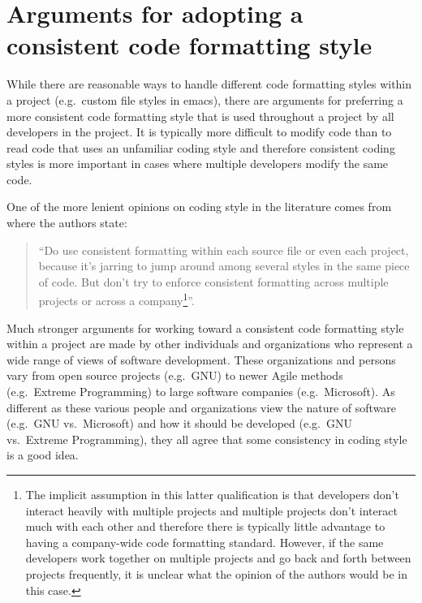 %
\section{Arguments for adopting a consistent code formatting style}
\label{sec:arguments-for-consistent-style}
%

While there are reasonable ways to handle different code formatting styles
within a project (e.g.\ custom file styles in emacs), there are arguments for
preferring a more consistent code formatting style that is used throughout a
project by all developers in the project.  It is typically more difficult to
modify code than to read code that uses an unfamiliar coding style and
therefore consistent coding styles is more important in cases where multiple
developers modify the same code.

One of the more lenient opinions on coding style in the literature comes from
{}\cite[Item 0]{C++CodingStandards05} where the authors state:

\begin{quote}

``Do use consistent formatting within each source file or even each project,
because it's jarring to jump around among several styles in the same piece of
code.  But don't try to enforce consistent formatting across multiple projects
or across a company\footnote{The implicit assumption in this latter
qualification is that developers don't interact heavily with multiple projects
and multiple projects don't interact much with each other and therefore there
is typically little advantage to having a company-wide code formatting
standard.  However, if the same developers work together on multiple projects
and go back and forth between projects frequently, it is unclear what the
opinion of the authors would be in this case.}''.

\end{quote}

Much stronger arguments for working toward a consistent code formatting style
within a project are made by other individuals and organizations who represent
a wide range of views of software development.  These organizations and
persons vary from open source projects (e.g.\ GNU) to newer Agile methods
(e.g.\ Extreme Programming) to large software companies (e.g.\ Microsoft).  As
different as these various people and organizations view the nature of
software (e.g.\ GNU vs.\ Microsoft) and how it should be developed (e.g.\ GNU
vs.\ Extreme Programming), they all agree that some consistency in coding
style is a good idea.

